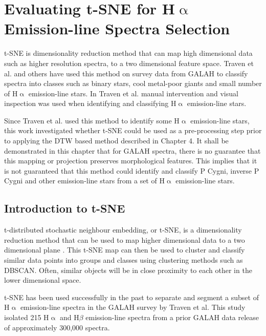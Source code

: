 \chapter{Evaluating t-SNE for H$\upalpha$ Emission-line Spectra Selection}

t-SNE is dimensionality reduction method that can map high dimensional data such as higher resolution spectra, to a two dimensional feature space. Traven et al. and others have used this method on survey data from GALAH to classify spectra into classes such as binary stars, cool metal-poor giants and small number of H$\upalpha$ emission-line stars. In Traven et al. manual intervention and visual inspection was used when identifying and classifying H$\upalpha$ emission-line stars.

Since Traven et al. used this method to identify some H$\upalpha$ emission-line stars, this work investigated whether t-SNE could be used as a pre-processing step prior to applying the DTW based method described in Chapter 4. It shall be demonstrated in this chapter that for GALAH spectra, there is no guarantee that this mapping or projection preserves morphological features. This implies that it is not guaranteed that this method could identify and classify P Cygni, inverse P Cygni and other emission-line stars from a set of H$\upalpha$ emission-line stars. 

\section{Introduction to t-SNE}

t-distributed stochastic neighbour embedding, or t-SNE, is a dimensionality reduction method that can be used to map higher dimensional data to a two dimensional plane\cite{van2008visualizing} . This t-SNE map can then be used to cluster and classify similar data points into groups and classes using clustering methods such as DBSCAN. Often, similar objects will be in close proximity to each other in the lower dimensional space.

t-SNE has been used successfully in the past to separate and segment a subset of H$\upalpha$ emission-line spectra in the GALAH survey by Traven et al. This study isolated 215 H$\upalpha$ and H$\beta$ emission-line spectra from a prior GALAH data release of approximately 300,000 spectra\cite{traven2017galah}.

